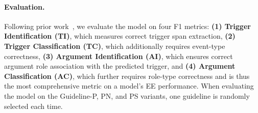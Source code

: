 \paragraph{Evaluation.} 
Following prior work~\cite{lin2020, huang2024textee}, we evaluate the model on four F1 metrics:
\textbf{(1) Trigger Identification (TI)}, which measures correct trigger span extraction, \textbf{(2) Trigger Classification (TC)}, which additionally requires event-type correctness, \textbf{(3) Argument Identification (AI)}, which ensures correct argument role association with the predicted trigger, and \textbf{(4) Argument Classification (AC)}, which further requires role-type correctness and is thus the most comprehensive metric on a model's EE performance. When evaluating the model on the Guideline-P, PN, and PS variants, one guideline is randomly selected each time.

